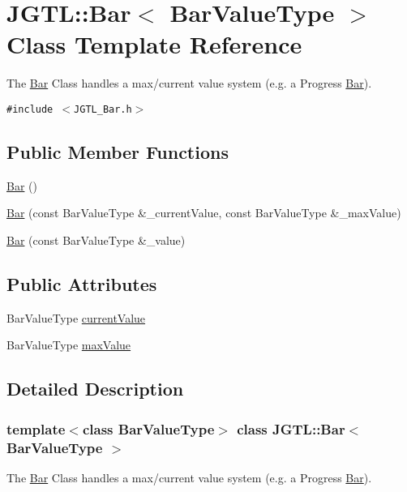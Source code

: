 \hypertarget{class_j_g_t_l_1_1_bar}{
\section{JGTL::Bar$<$ Bar\-Value\-Type $>$ Class Template Reference}
\label{class_j_g_t_l_1_1_bar}
}
The \hyperlink{class_j_g_t_l_1_1_bar}{Bar} Class handles a max/current value system (e.g. a Progress \hyperlink{class_j_g_t_l_1_1_bar}{Bar}).  


{\tt \#include $<$JGTL\_\-Bar.h$>$}

\subsection*{Public Member Functions}
\begin{CompactItemize}
\item 
\hyperlink{class_j_g_t_l_1_1_bar_4062490561fb2673bc0e10883dc34303}{Bar} ()
\item 
\hyperlink{class_j_g_t_l_1_1_bar_6dec0180bae966481b4d060d10781dfe}{Bar} (const Bar\-Value\-Type \&\_\-current\-Value, const Bar\-Value\-Type \&\_\-max\-Value)
\item 
\hyperlink{class_j_g_t_l_1_1_bar_f847730457e55a0cfecb6c918cc3366f}{Bar} (const Bar\-Value\-Type \&\_\-value)
\end{CompactItemize}
\subsection*{Public Attributes}
\begin{CompactItemize}
\item 
Bar\-Value\-Type \hyperlink{class_j_g_t_l_1_1_bar_dd6c45f5cbd5b7da6f56a990013c1449}{current\-Value}
\item 
Bar\-Value\-Type \hyperlink{class_j_g_t_l_1_1_bar_e2d5d3214a0fe6036839c1ec3d8e4e0b}{max\-Value}
\end{CompactItemize}


\subsection{Detailed Description}
\subsubsection*{template$<$class Bar\-Value\-Type$>$ class JGTL::Bar$<$ Bar\-Value\-Type $>$}

The \hyperlink{class_j_g_t_l_1_1_bar}{Bar} Class handles a max/current value system (e.g. a Progress \hyperlink{class_j_g_t_l_1_1_bar}{Bar}). 

